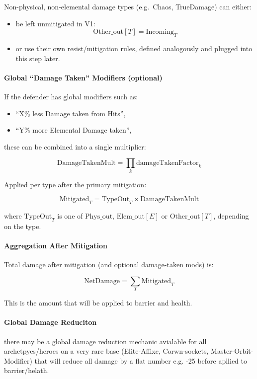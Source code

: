 Non-physical, non-elemental damage types (e.g.\ Chaos, TrueDamage) can either:

\begin{itemize}
	\item be left unmitigated in V1:
	\[
	\text{Other\_out}[T] = \text{Incoming}_T
	\]
	\item or use their own resist/mitigation rules, defined analogously and plugged into this step later.
\end{itemize}

\paragraph{Global ``Damage Taken'' Modifiers (optional)}

If the defender has global modifiers such as:

\begin{itemize}
	\item ``X\% less Damage taken from Hits'',
	\item ``Y\% more Elemental Damage taken'',
\end{itemize}

these can be combined into a single multiplier:

\[
\text{DamageTakenMult} = \prod_k \text{damageTakenFactor}_k
\]

Applied per type after the primary mitigation:

\[
\text{Mitigated}_T = \text{TypeOut}_T \times \text{DamageTakenMult}
\]

where $\text{TypeOut}_T$ is one of $\text{Phys\_out}$, $\text{Elem\_out}[E]$ or $\text{Other\_out}[T]$,
depending on the type.

\paragraph{Aggregation After Mitigation}

Total damage after mitigation (and optional damage-taken mods) is:

\[
\text{NetDamage} = \sum_T \text{Mitigated}_T
\]

This is the amount that will be applied to barrier and health.

\paragraph{Global Damage Reduciton }
there may be a global damage reduction mechanic avialable for all archetpyes/heroes on a very rare base (Elite-Affixe, Corwn-sockets, Master-Orbit-Modifier) that will reduce all damage by a flat number e.g. -25 before apllied to barrier/helath.

